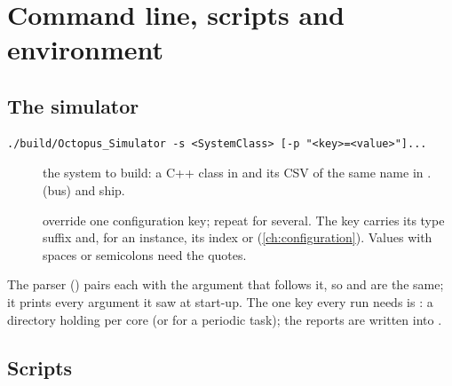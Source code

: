 \chapter{Command line, scripts and environment}\label{app:cli}

\section{The simulator}

\begin{lstlisting}[style=shell]
./build/Octopus_Simulator -s <SystemClass> [-p "<key>=<value>"]...
\end{lstlisting}

\begin{description}
\item[] the system to build: a C++ class in  and
  its CSV of the same name in . 
  (bus) and  ship.
\item[] override one configuration key; repeat for several. The key
  carries its type suffix and, for an instance, its index or \code{[*]}
  (\cref{ch:configuration}). Values with spaces or semicolons need the quotes.
\end{description}

The parser () pairs each  with the argument that follows it, so
 and  are the same; it prints every argument it saw at
start-up. The one key every run needs is : a directory holding
 per core (or  for a periodic task); the
reports are written into .

\section{Scripts}


